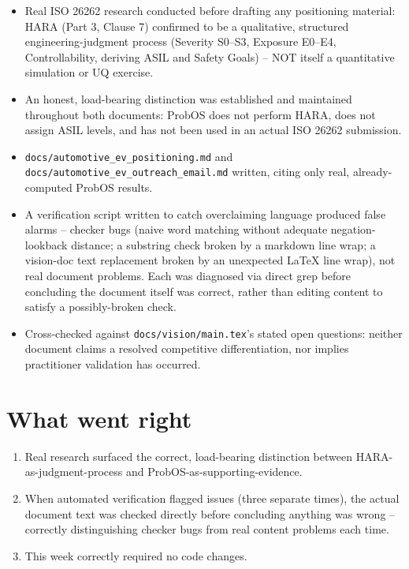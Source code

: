 \documentclass[11pt]{article}
\begin{document}
\begin{itemize}[leftmargin=*]
  \item Real ISO 26262 research conducted before drafting any
    positioning material: HARA (Part 3, Clause 7) confirmed to be a
    qualitative, structured engineering-judgment process (Severity
    S0--S3, Exposure E0--E4, Controllability, deriving ASIL and Safety
    Goals) -- NOT itself a quantitative simulation or UQ exercise.
  \item An honest, load-bearing distinction was established and
    maintained throughout both documents: ProbOS does not perform
    HARA, does not assign ASIL levels, and has not been used in an
    actual ISO 26262 submission.
  \item \texttt{docs/automotive\_ev\_positioning.md} and
    \texttt{docs/automotive\_ev\_outreach\_email.md} written, citing
    only real, already-computed ProbOS results.
  \item A verification script written to catch overclaiming language
    produced false alarms -- checker bugs (naive word matching
    without adequate negation-lookback distance; a substring check
    broken by a markdown line wrap; a vision-doc text replacement
    broken by an unexpected LaTeX line wrap), not real document
    problems. Each was diagnosed via direct grep before concluding
    the document itself was correct, rather than editing content to
    satisfy a possibly-broken check.
  \item Cross-checked against \texttt{docs/vision/main.tex}'s stated
    open questions: neither document claims a resolved competitive
    differentiation, nor implies practitioner validation has occurred.
\end{itemize}

\section*{What went right}
\begin{enumerate}[leftmargin=*]
  \item Real research surfaced the correct, load-bearing distinction
    between HARA-as-judgment-process and ProbOS-as-supporting-evidence.
  \item When automated verification flagged issues (three separate
    times), the actual document text was checked directly before
    concluding anything was wrong -- correctly distinguishing checker
    bugs from real content problems each time.
  \item This week correctly required no code changes.
\end{enumerate}
\end{document}

